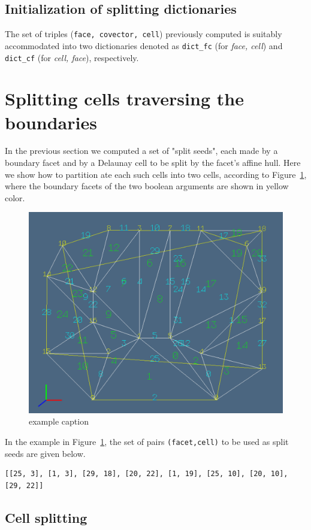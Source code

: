 \documentclass[11pt,oneside]{article}	%
\begin{document}
\subsection{Initialization of splitting dictionaries}
The set of triples (\texttt{face, covector, cell}) previously computed is suitably accommodated into two dictionaries denoted as \texttt{dict\_fc} (for \emph{face, cell}) and \texttt{dict\_cf} (for \emph{cell, face}), respectively.


\section{Splitting cells traversing the boundaries}
\label{sec:crossing}
In the previous section we computed a set of "split seeds", each made by a boundary facet and by a Delaunay cell to be split by the facet's affine hull. Here we show how to partition ate each such cells into two cells, according to Figure~\ref{fig:splitting}, where the boundary facets of the two boolean arguments are shown in yellow color.

\begin{figure}[htbp] %
   \centering
   \includegraphics[width=0.6\linewidth]{images/splitting} 
   \caption{example caption}
   \label{fig:splitting}
\end{figure}

In the example in Figure~\ref{fig:splitting}, the set of pairs \texttt{(facet,cell)} to be used as split seeds are given below.
{\small
\begin{verbatim}
[[25, 3], [1, 3], [29, 18], [20, 22], [1, 19], [25, 10], [20, 10], [29, 22]]
\end{verbatim}}

\subsection{Cell splitting}
\end{document}
